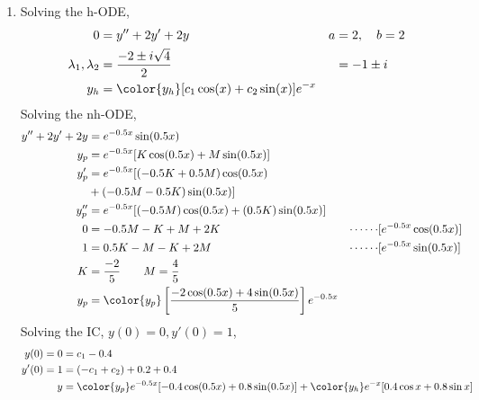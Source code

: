 \begin{enumerate}
    \item Solving the h-ODE,
          \begin{align}
              0                        & = y'' + 2y' + 2y                                  & a & = 2, \quad b = 2 \\
              \lambda_{1}, \lambda_{2} & = \frac{-2 \pm i\sqrt{4}}{2}                      &   & = -1 \pm i       \\
              y_{h}                    & = \color{y_h} [c_{1}\cos(x) + c_{2}\sin(x)]e^{-x}
          \end{align}
          Solving the nh-ODE,
          \begin{align}
              y'' + 2y' + 2y & = e^{-0.5x}\sin(0.5x)                                                                                              \\
              y_{p}          & = e^{-0.5x}[K\cos(0.5x) + M\sin(0.5x)]                                                                             \\
              y_{p}'         & = e^{-0.5x}[(-0.5K + 0.5M)\cos(0.5x)                                                                               \\
                             & + (-0.5M - 0.5K)\sin(0.5x)]                                                                                        \\
              y_{p}''        & = e^{-0.5x}[(-0.5M)\cos(0.5x) + (0.5K)\sin(0.5x)]                                                                  \\
              0              & = -0.5M -K + M + 2K                                                         & \cdots\cdots & [e^{-0.5x}\cos(0.5x)] \\
              1              & = 0.5K - M - K + 2M                                                         & \cdots\cdots & [e^{-0.5x}\sin(0.5x)] \\
              K              & = \frac{-2}{5} \qquad M = \frac{4}{5}                                                                              \\
              y_{p}          & = \color{y_p} \left[ \frac{-2\cos(0.5x) + 4\sin(0.5x)}{5} \right] e^{-0.5x}
          \end{align}
          Solving the IC, $ y(0) = 0, y'(0) = 1 $,
          \begin{align}
              y(0) = 0  & = c_{1} - 0.4                                                                                           \\
              y'(0) = 1 & = (-c_{1} + c_{2}) + 0.2 + 0.4                                                                          \\
              y         & = {\color{y_p} e^{-0.5x}[-0.4\cos(0.5x) + 0.8\sin(0.5x)]} + {\color{y_h} e^{-x}[0.4\cos x + 0.8\sin x]}
          \end{align}


\end{enumerate}
